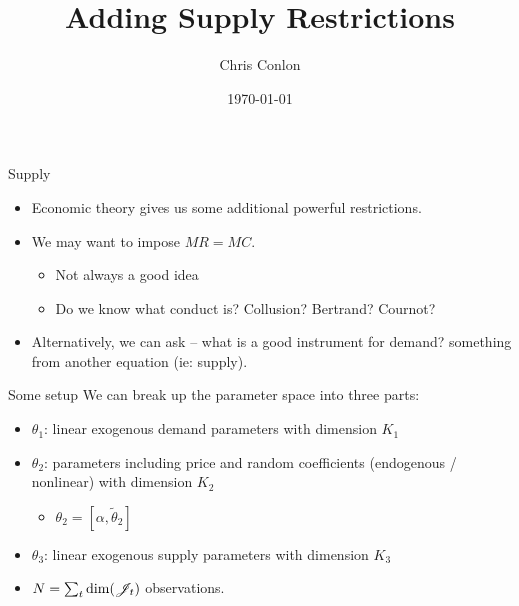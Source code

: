 \documentclass[aspectratio=169,11pt]{beamer}
\begin{document}
\title{Adding Supply Restrictions }
\author{Chris Conlon}
\date{\today}

\frame{\titlepage}

\begin{frame}{Supply}
\begin{itemize}
\item Economic theory gives us some additional powerful restrictions.
\item We may want to impose $MR = MC$.
\begin{itemize}
\item Not always a good idea
\item Do we know what conduct is? Collusion? Bertrand? Cournot?
\end{itemize}

\item Alternatively, we can ask -- what is a good instrument for demand? \alert{something from another equation} (ie: supply).
\end{itemize}
\end{frame}

\begin{frame}{Some setup}
We can break up the parameter space into three parts:
\begin{itemize}
\item $\theta_1$: linear exogenous demand parameters with dimension $K_1$
 \item $\theta_2$: parameters including price and random coefficients (endogenous / nonlinear) with dimension $K_2$
 \begin{itemize}
 \item $\theta_2 = [\alpha, \widetilde{\theta}_2]$
\end{itemize}
 \item $\theta_3$: linear exogenous supply parameters with dimension $K_3$
 \item $N = \sum_{t} \dim(\mathscr{J}_t)$ observations.
\end{itemize}
\end{frame}
\end{document}
